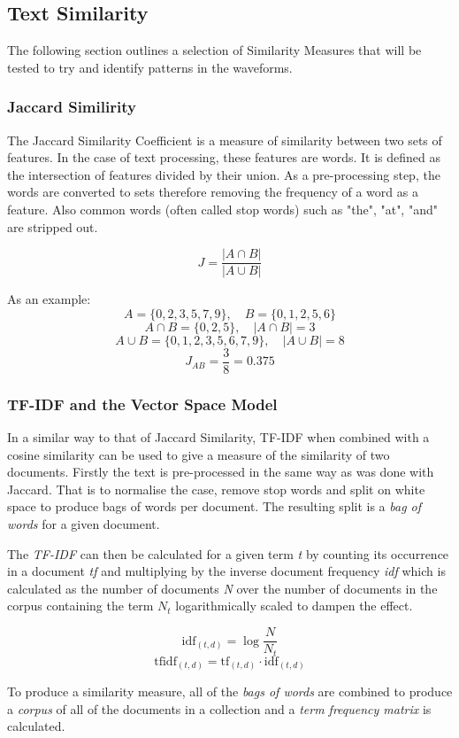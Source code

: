 \documentclass[../report.tex]{subfiles}
\begin{document}
\subsection{Text Similarity}

	The following section outlines a selection of Similarity Measures that will be tested to try and identify patterns in the waveforms.

\subsubsection{Jaccard Similirity} \label{sec:jaccard}

	The Jaccard Similarity Coefficient is a measure of similarity between two sets of features.  In the case of text processing, these features are words.  It is defined as the intersection of features divided by their union.  As a pre-processing step, the words are converted to sets therefore removing the frequency of a word as a feature.  Also common words (often called stop words) such as "the", "at", "and" are stripped out.
	
	$$
	J = \frac{|A \cap B|}{|A \cup B|}
	$$
	
	As an example:
	$$ A = \{0, 2, 3, 5, 7, 9\},\quad B = \{0, 1, 2, 5, 6\} $$
	$$ A\cap B = \{0, 2, 5\},\quad |A\cap B| = 3 $$
	$$ A\cup B = \{0, 1, 2, 3, 5, 6, 7, 9\},\quad |A\cup B| = 8	$$
	$$ J_{AB} = \frac{3}{8} = 0.375 $$

\subsubsection{TF-IDF and the Vector Space Model}
	
	In a similar way to that of Jaccard Similarity, TF-IDF when combined with a cosine similarity can be used to give a measure of the similarity of two documents.  Firstly the text is pre-processed in the same way as was done with Jaccard.  That is to normalise the case, remove stop words and split on white space to produce bags of words per document.  The resulting split is a \textit{bag of words} for a given document.
	
	The \textit{TF-IDF} can then be calculated for a given term \textit{t} by counting its occurrence in a document \textit{tf} and multiplying by the inverse document frequency \textit{idf} which is calculated as the number of documents \textit{N} over the number of documents in the corpus containing the term \textit{$N_{t}$} logarithmically scaled to dampen the effect.
	
	$$ \text{idf}_{(t,d)} = \log{\frac{N}{N_{t}}}$$
	$$ \text{tfidf}_{(t, d)} = \text{tf}_{(t,d)} \cdot \text{idf}_{(t,d)} $$
	
	To produce a similarity measure, all of the \textit{bags of words} are combined to produce a \textit{corpus} of all of the documents in a collection and a \textit{term frequency matrix} is calculated.
\end{document}
